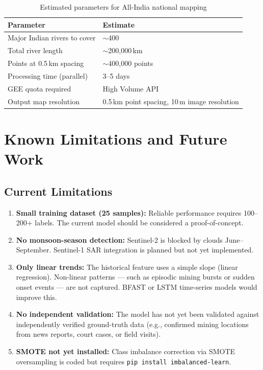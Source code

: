 \documentclass[12pt, a4paper]{article}
\begin{document}
\begin{table}[H]
\centering
\begin{tabular}{ll}
\toprule
\textbf{Parameter} & \textbf{Estimate} \\
\midrule
Major Indian rivers to cover & $\sim$400 \\
Total river length & $\sim$200,000\,km \\
Points at 0.5\,km spacing & $\sim$400,000 points \\
Processing time (parallel) & 3--5 days \\
GEE quota required & High Volume API \\
Output map resolution & 0.5\,km point spacing, 10\,m image resolution \\
\bottomrule
\end{tabular}
\caption{Estimated parameters for All-India national mapping}
\end{table}

\section{Known Limitations and Future Work}

\subsection{Current Limitations}

\begin{enumerate}
  \item \textbf{Small training dataset (25 samples):} Reliable
        performance requires 100--200+ labels. The current model
        should be considered a proof-of-concept.

  \item \textbf{No monsoon-season detection:} Sentinel-2 is blocked
        by clouds June--September. Sentinel-1 SAR integration is
        planned but not yet implemented.

  \item \textbf{Only linear trends:} The historical feature uses a
        simple slope (linear regression). Non-linear patterns ---
        such as episodic mining bursts or sudden onset events ---
        are not captured. BFAST or LSTM time-series models would
        improve this.

  \item \textbf{No independent validation:} The model has not yet
        been validated against independently verified ground-truth
        data (e.g., confirmed mining locations from news reports,
        court cases, or field visits).

  \item \textbf{SMOTE not yet installed:} Class imbalance correction
        via SMOTE oversampling is coded but requires \texttt{pip install
        imbalanced-learn}.
\end{enumerate}
\end{document}
